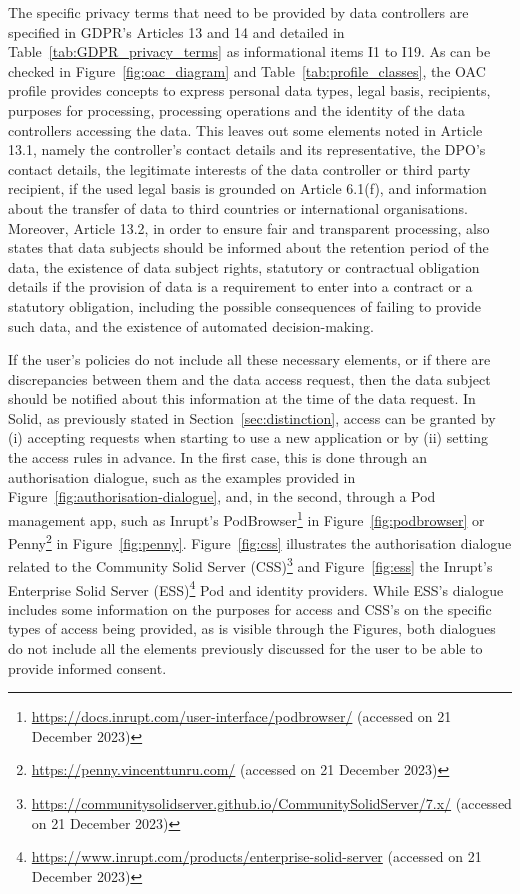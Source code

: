 The specific privacy terms that need to be provided by data controllers are specified in GDPR's Articles 13 and 14 and detailed in Table~\ref{tab:GDPR_privacy_terms} as informational items I1 to I19.
As can be checked in Figure~\ref{fig:oac_diagram} and Table~\ref{tab:profile_classes}, the OAC profile provides concepts to express personal data types, legal basis, recipients, purposes for processing, processing operations and the identity of the data controllers accessing the data. 
This leaves out some elements noted in Article 13.1, namely the controller's contact details and its representative, the DPO's contact details, the legitimate interests of the data controller or third party recipient, if the used legal basis is grounded on Article 6.1(f), and information about the transfer of data to third countries or international organisations.
Moreover, Article 13.2, in order to ensure fair and transparent processing, also states that data subjects should be informed about the retention period of the data, the existence of data subject rights, statutory or contractual obligation details if the provision of data is a requirement to enter into a contract or a statutory obligation, including the possible consequences of failing to provide such data, and the existence of automated decision-making.

If the user’s policies do not include all these necessary elements, or if there are discrepancies between them and the data access request, then the data subject should be notified about this information at the time of the data request.
In Solid, as previously stated in Section~\ref{sec:distinction}, access can be granted by (i) accepting requests when starting to use a new application or by (ii) setting the access rules in advance.
In the first case, this is done through an authorisation dialogue, such as the examples provided in Figure~\ref{fig:authorisation-dialogue}, and, in the second, through a Pod management app, such as Inrupt's PodBrowser\footnote{{\url{https://docs.inrupt.com/user-interface/podbrowser/} (accessed on 21 December 2023)}} in Figure~\ref{fig:podbrowser} or Penny\footnote{{\url{https://penny.vincenttunru.com/} (accessed on 21 December 2023)}} in Figure~\ref{fig:penny}.
Figure~\ref{fig:css} illustrates the authorisation dialogue related to the Community Solid Server (CSS)\footnote{{\url{https://communitysolidserver.github.io/CommunitySolidServer/7.x/} (accessed on 21 December 2023)}} and Figure~\ref{fig:ess} the Inrupt's Enterprise Solid Server (ESS)\footnote{{\url{https://www.inrupt.com/products/enterprise-solid-server} (accessed on 21 December 2023)}} Pod and identity providers.
While ESS's dialogue includes some information on the purposes for access and CSS's on the specific types of access being provided, as is visible through the Figures, both dialogues do not include all the elements previously discussed for the user to be able to provide informed consent.

